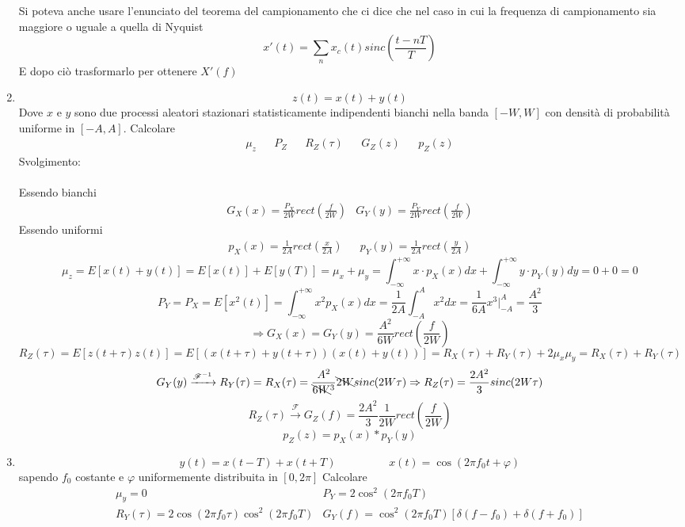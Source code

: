 \documentclass{article}
\newcommand{\accapo}{\\\hspace*{1cm}\\}
\newcommand{\trasformata}{\xrightarrow{\mathscr{F}}}
\newcommand{\antitrasformata}{\xrightarrow{\mathscr{F}^{-1}}}
\newcommand{\intfity}{\int_{-\infty}^{+\infty}}
\begin{document}
\begin{enumerate}
    Si poteva anche usare l'enunciato del teorema del campionamento che ci dice che nel caso in cui la frequenza di campionamento sia maggiore o uguale a quella di Nyquist
    \[x'(t)=\sum_{n} x_c(t)sinc\left(\frac{t-nT}{T}\right)\]
    E dopo ciò trasformarlo per ottenere \(X'(f)\)
  \item \[z(t)=x(t)+y(t)\]
    Dove \(x\) e \(y\) sono due processi aleatori stazionari statisticamente indipendenti bianchi nella banda \([-W,W]\) con densità di probabilità uniforme in \([-A,A]\). Calcolare
    \[\begin{matrix}
      \mu_z&&P_Z&&R_Z(\tau)&&G_Z(z)&&p_Z(z)
    \end{matrix}\]
    Svolgimento:\accapo
    Essendo bianchi
    \[\begin{matrix}
      G_X(x)=\frac{P_X}{2W}rect\left(\frac{f}{2W}\right)&G_Y(y)=\frac{P_Y}{2W}rect\left(\frac{f}{2W}\right)
    \end{matrix}\]
    Essendo uniformi
    \[\begin{matrix}
      p_X(x)=\frac{1}{2A}rect\left(\frac{x}{2A}\right)&&p_Y(y)=\frac{1}{2A}rect\left(\frac{y}{2A}\right)
    \end{matrix}\]
    \[\mu_z=E[x(t)+y(t)]=E[x(t)]+E[y(T)]=\mu_x+\mu_y=\intfity x\cdot p_X(x)dx+\intfity y\cdot p_Y(y)dy=0+0=0\]
    \[P_Y=P_X=E[x^2(t)]=\intfity x^2 p_X(x)dx=\frac{1}{2A}\int_{-A}^A x^2dx=\frac{1}{6A}x^3\Big|_{-A}^A=\frac{A^2}{3}\]
    \[\Rightarrow G_X(x)=G_Y(y)=\frac{A^2}{6W}rect\left(\frac{f}{2W}\right)\]
    \[R_Z(\tau)=E[z(t+\tau)z(t)]=E[(x(t+\tau)+y(t+\tau))(x(t)+y(t))]=R_X(\tau)+R_Y(\tau)+2\mu_x \mu_y=R_X(\tau)+R_Y(\tau)\]
    \[G_Y(y)\antitrasformata R_Y(\tau)=R_X(\tau)=\frac{A^2}{\bcancel{6W}^3}\bcancel{2W}sinc(2W\tau)\Rightarrow R_Z(\tau)=\frac{2A^2}{3}sinc(2W\tau)\]
    \[R_Z(\tau)\trasformata G_Z(f)=\frac{2A^2}{3}\frac{1}{2W}rect\left(\frac{f}{2W}\right)\]
    \[p_Z(z)=p_X(x)*p_Y(y)\]
  \item \[y(t)=x(t-T)+x(t+T)\hspace{2cm} x(t)=\cos(2\pi f_0t+\varphi)\]
    sapendo \(f_0\) costante e \(\varphi\) uniformemente distribuita in \([0,2\pi]\)
    Calcolare 
    \[\begin{matrix}
      \mu_y=0&P_Y=2\cos^2(2\pi f_0T)\\
      R_Y(\tau)=2\cos(2\pi f_0\tau)\cos^2(2\pi f_0 T)&G_Y(f)=\cos^2(2\pi f_0 T)[\delta(f-f_0)+\delta(f+f_0)]
    \end{matrix}\]
\end{enumerate}
\end{document}
